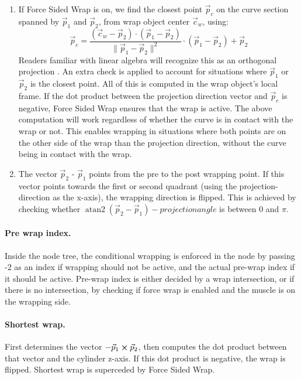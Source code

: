 \documentclass{article}
\DeclareMathOperator{\atantwo}{atan2}
\begin{document}
\begin{enumerate}
\item If Force Sided Wrap is on, we find the closest point $\vec{p}_c$ on the curve section spanned by $\vec{p}_{1}$ and $\vec{p}_{2}$, from wrap object center $\vec{c}_w$, using: 
 \begin{equation}
 \vec{p}_c = \frac{(\vec{c}_w - \vec{p}_2) \cdot (\vec{p}_1 - \vec{p}_2)}{\lVert \vec{p}_1 - \vec{p}_2 \rVert^{2}} \cdot (\vec{p}_1 - \vec{p}_2) + \vec{p}_2
 \end{equation}
Readers familiar with linear algebra will recognize this as an orthogonal projection \cite{layLinearAlgebraIts2016}. An extra check is applied to account for situations where $\vec{p}_{1}$ or $\vec{p}_{2}$ is the closest point. All of this is computed in the wrap object's local frame. If the dot product between the projection direction vector and $\vec{p}_c$ is negative, Force Sided Wrap ensures that the wrap is active. The above computation will work regardless of whether the curve is in contact with the wrap or not. This enables wrapping in situations where both points are on the other side of the wrap than the projection direction, without the curve being in contact with the wrap.
 \item The vector $\vec{p}_{2}$ - $\vec{p}_{1}$ points from the pre to the post wrapping point. If this vector points towards the first or second quadrant (using the projection-direction as the x-axis), the wrapping direction is flipped. This is achieved by checking whether $\atantwo{(\vec{p}_{2} - \vec{p}_{1})} - projection angle$ is between 0 and $\pi$.
\end{enumerate}


\paragraph{Pre wrap index.} Inside the node tree, the conditional wrapping is enforced in the node by passing -2 as an index if wrapping should not be active, and the actual pre-wrap index if it should be active. Pre-wrap index is either decided by a wrap intersection, or if there is no intersection, by checking if force wrap is enabled and the muscle is on the wrapping side.


\paragraph{Shortest wrap.} First determines the vector $-\vec{p}_{1} \cross \vec{p}_{2}$, then computes the dot product between that vector and the cylinder z-axis. If this dot product is negative, the wrap is flipped. Shortest wrap is superceded by Force Sided Wrap.
\end{document}
